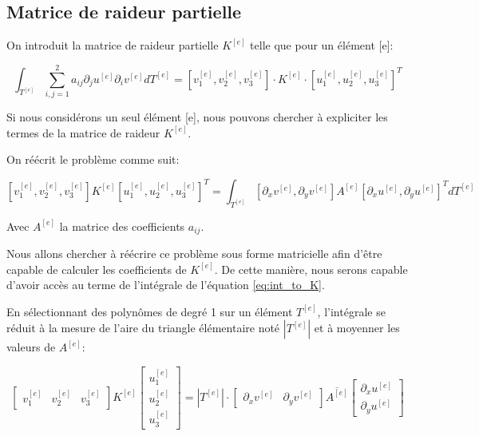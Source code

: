 \documentclass{article}
\begin{document}
\subsection{Matrice de raideur partielle}

On introduit la matrice de raideur partielle
$K^{[e]}$ telle que pour un élément [e]:

\begin{equation}
    \int_{T^{[e]}} \sum_{i,j=1}^2 a_{ij} \partial_j u ^{[e]}
     \partial_i v^{[e]} dT^{[e]} 
     = \left[ v_1^{[e]}, v_2^{[e]},  v_3^{[e]} \right] \cdot K^{[e]}
     \cdot \left[ u_1^{[e]}, u_2^{[e]}, u_3^{[e]} \right]^T
    \label{eq:int_to_K}
\end{equation}

Si nous considérons un seul élément [e], nous pouvons chercher à expliciter
les termes de la matrice de raideur $K^{[e]}$.

On réécrit le problème comme suit:

\begin{equation}
    \left[ v_1^{[e]}, v_2^{[e]},  v_3^{[e]} \right] K^{[e]}
     \left[ u_1^{[e]}, u_2^{[e]}, u_3^{[e]} \right]^T
     = \int_{T^{[e]}} \left[\partial_x v^{[e]},
     \partial_y v^{[e]}\right] A^{[e]} \left[\partial_x u^{[e]},
     \partial_y u^{[e]}\right]^T dT^{[e]}
\end{equation}

Avec $A^{[e]}$ la matrice des coefficients $a_{ij}$.

Nous allons chercher à réécrire ce problème sous forme matricielle
afin d'être capable de calculer les coefficients de $K^{[e]}$.
De cette manière, nous serons capable d'avoir accès au terme
de l'intégrale de l'équation \ref{eq:int_to_K}.

En sélectionnant des polynômes de degré 1 sur un élément $T^{[e]}$,
l'intégrale se réduit à la mesure de l'aire du triangle élémentaire
noté $|T^{[e]}|$ et à moyenner les valeurs de $A^{[e]}$:

\begin{equation}
    \begin{bmatrix}
        v_1^{[e]} & v_2^{[e]} &  v_3^{[e]}
    \end{bmatrix}
    K^{[e]}
    \begin{bmatrix}
        u_1^{[e]} \\ u_2^{[e]} \\ u_3^{[e]}
    \end{bmatrix}
     = |T^{[e]}| \cdot
    \begin{bmatrix}
        \partial_x v^{[e]} & \partial_y v^{[e]}
    \end{bmatrix}
    \overline{A^{[e]}}
    \begin{bmatrix}
        \partial_x u^{[e]} \\ \partial_y u^{[e]}
    \end{bmatrix}
    \label{eq:vKu_eq}
\end{equation}
\end{document}
